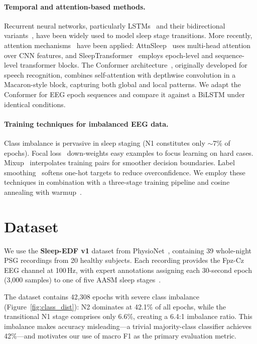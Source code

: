 \documentclass[final]{article}
\begin{document}
\paragraph{Temporal and attention-based methods.}
Recurrent neural networks, particularly LSTMs~\cite{Hochreiter1997} and their bidirectional variants~\cite{Schuster1997}, have been widely used to model sleep stage transitions. More recently, attention mechanisms~\cite{Vaswani2017} have been applied: AttnSleep~\cite{Eldele2021} uses multi-head attention over CNN features, and SleepTransformer~\cite{Phan2022} employs epoch-level and sequence-level transformer blocks. The Conformer architecture~\cite{Gulati2020}, originally developed for speech recognition, combines self-attention with depthwise convolution in a Macaron-style block, capturing both global and local patterns. We adapt the Conformer for EEG epoch sequences and compare it against a BiLSTM under identical conditions.

\paragraph{Training techniques for imbalanced EEG data.}
Class imbalance is pervasive in sleep staging (N1 constitutes only $\sim$7\% of epochs). Focal loss~\cite{Lin2017} down-weights easy examples to focus learning on hard cases. Mixup~\cite{Zhang2018} interpolates training pairs for smoother decision boundaries. Label smoothing~\cite{Berry2012} softens one-hot targets to reduce overconfidence. We employ these techniques in combination with a three-stage training pipeline and cosine annealing with warmup~\cite{Loshchilov2017}.

\section{Dataset}

We use the \textbf{Sleep-EDF v1} dataset from PhysioNet~\cite{SleepEDF2018, Goldberger2000}, containing 39 whole-night PSG recordings from 20 healthy subjects. Each recording provides the Fpz-Cz EEG channel at 100\,Hz, with expert annotations assigning each 30-second epoch (3,000 samples) to one of five AASM sleep stages~\cite{Berry2012}.

The dataset contains 42,308 epochs with severe class imbalance (Figure~\ref{fig:class_dist}): N2 dominates at 42.1\% of all epochs, while the transitional N1 stage comprises only 6.6\%, creating a 6.4:1 imbalance ratio. This imbalance makes accuracy misleading---a trivial majority-class classifier achieves 42\%---and motivates our use of macro F1 as the primary evaluation metric.
\end{document}
